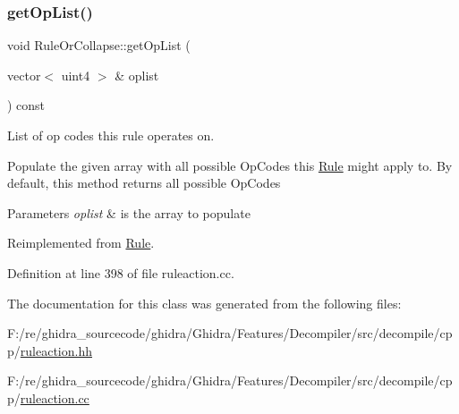 \subsubsection{\texorpdfstring{getOpList()}{getOpList()}}
{\footnotesize\ttfamily void Rule\+Or\+Collapse\+::get\+Op\+List (\begin{DoxyParamCaption}\item[{vector$<$ uint4 $>$ \&}]{oplist }\end{DoxyParamCaption}) const\hspace{0.3cm}{\ttfamily [virtual]}}



List of op codes this rule operates on. 

Populate the given array with all possible Op\+Codes this \mbox{\hyperlink{class_rule}{Rule}} might apply to. By default, this method returns all possible Op\+Codes 
\begin{DoxyParams}{Parameters}
{\em oplist} & is the array to populate \\
\hline
\end{DoxyParams}


Reimplemented from \mbox{\hyperlink{class_rule_a4023bfc7825de0ab866790551856d10e}{Rule}}.



Definition at line 398 of file ruleaction.\+cc.



The documentation for this class was generated from the following files\+:\begin{DoxyCompactItemize}
\item 
F\+:/re/ghidra\+\_\+sourcecode/ghidra/\+Ghidra/\+Features/\+Decompiler/src/decompile/cpp/\mbox{\hyperlink{ruleaction_8hh}{ruleaction.\+hh}}\item 
F\+:/re/ghidra\+\_\+sourcecode/ghidra/\+Ghidra/\+Features/\+Decompiler/src/decompile/cpp/\mbox{\hyperlink{ruleaction_8cc}{ruleaction.\+cc}}\end{DoxyCompactItemize}
